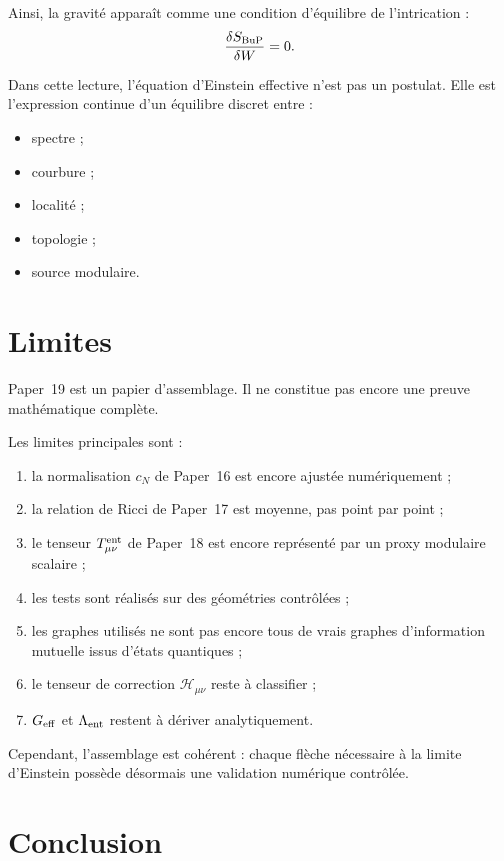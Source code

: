 \documentclass[11pt,a4paper]{article}
\begin{document}
Ainsi, la gravité apparaît comme une condition d'équilibre de l'intrication :
\[
\frac{\delta S_{\rm BuP}}{\delta W}=0.
\]

Dans cette lecture, l'équation d'Einstein effective n'est pas un postulat.
Elle est l'expression continue d'un équilibre discret entre :

\begin{itemize}
    \item spectre ;
    \item courbure ;
    \item localité ;
    \item topologie ;
    \item source modulaire.
\end{itemize}

\section{Limites}

Paper~19 est un papier d'assemblage. Il ne constitue pas encore une preuve
mathématique complète.

Les limites principales sont :

\begin{enumerate}
    \item la normalisation \(c_N\) de Paper~16 est encore ajustée numériquement ;
    \item la relation de Ricci de Paper~17 est moyenne, pas point par point ;
    \item le tenseur \(T_{\mu\nu}^{\rm ent}\) de Paper~18 est encore représenté par un proxy modulaire scalaire ;
    \item les tests sont réalisés sur des géométries contrôlées ;
    \item les graphes utilisés ne sont pas encore tous de vrais graphes d'information mutuelle issus d'états quantiques ;
    \item le tenseur de correction \(\mathcal{H}_{\mu\nu}\) reste à classifier ;
    \item \(G_{\rm eff}\) et \(\Lambda_{\rm ent}\) restent à dériver analytiquement.
\end{enumerate}

Cependant, l'assemblage est cohérent : chaque flèche nécessaire à la limite
d'Einstein possède désormais une validation numérique contrôlée.

\section{Conclusion}
\end{document}
